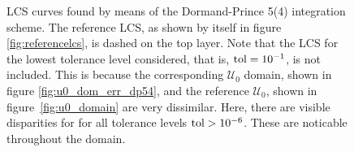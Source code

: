 \begin{figure}[htpb]
    \centering
    
    \caption[LCS curves found by means of the Dormand-Prince 5(4) integration
    scheme]{
        LCS curves found by means of the Dormand-Prince 5(4) integration
        scheme. The reference LCS, as shown by itself in figure
        \ref{fig:referencelcs}, is dashed on the top layer. Note that
        the LCS for the lowest tolerance level considered, that is,
        $\textnormal{tol}=10^{-1}$, is not included. This is because the
        corresponding $\mathcal{U}_{0}$ domain, shown in figure
        \ref{fig:u0_dom_err_dp54}, and the reference $\mathcal{U}_{0}$, shown
        in figure~\ref{fig:u0_domain} are very dissimilar. Here, there are visible
        disparities for for all tolerance levels $\textnormal{tol}>10^{-6}$.
        These are noticable throughout the domain.}
    \label{fig:lcs_rkdp54}
\end{figure}

